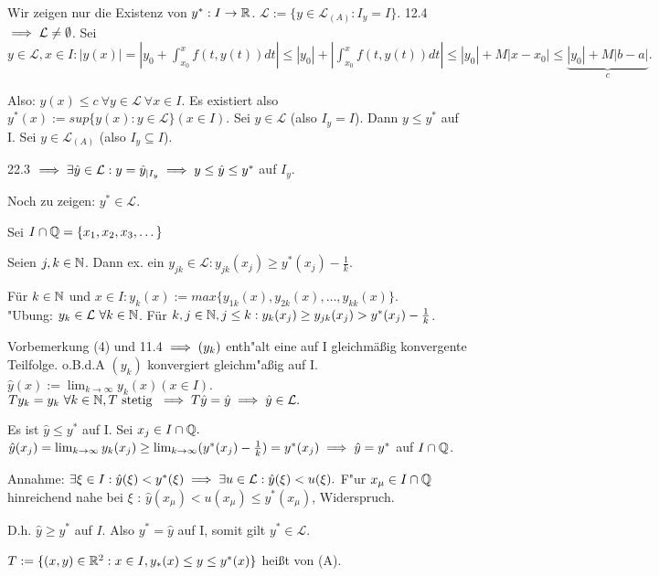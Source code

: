 \documentclass{article}
\begin{document}
\begin{beweis}
Wir zeigen nur die Existenz von $y^* : I \to \mathbb{R}$.
  $\mathcal{L} := \{ y \in \mathcal{L}_{(A)} : I_y = I\}$. 12.4 $\implies \mathcal{L} \neq \emptyset$.
Sei $y \in \mathcal{L}, x \in I : |y(x)| = |y_0 + \int_{x_0}^{x} f(t,y(t)) dt| \leq |y_0| + | \int_{x_0}^{x} f(t,y(t)) dt|
\leq |y_0| + M |x-x_0| \leq \underbrace{|y_0| + M | b-a |}_{c}.$

Also: $y(x) \leq c \ \forall y \in \mathcal{L} \ \forall x \in I.$ 
Es existiert also $y^*(x) := sup \{ y(x) : y \in \mathcal{L} \} (x \in I).$
Sei $y \in  \mathcal{L}$ (also $I_y = I$). Dann $y \leq y^*$ auf I. Sei $y \in \mathcal{L}_{(A)}$ (also $I_y \subseteq I$). 

22.3 $\implies \exists \hat{y} \in \mathcal{L}: y = \hat{y}_{|I_y} \implies y \leq \hat{y} \leq y^*$ auf $I_y$.

Noch zu zeigen: $y^* \in \mathcal{L}.$

Sei $I \cap \mathbb{Q} = \{ x_1,x_2,x_3, \dots \} $

Seien $j,k \in \mathbb{N}$. Dann ex. ein $y_{jk} \in \mathcal{L}: y_{jk}(x_j) \geq y^*(x_j) - \frac{1}{k}.$

Für $k \in \mathbb{N}$ und $x\in I: y_k(x) := max\{y_{1k}(x),y_{2k}(x),\dots, y_{kk}(x)\}. $\\ "Ubung: $y_k \in \mathcal{L} \ \forall k \in \mathbb{N}$.
Für $k,j  \in \mathbb{N}, j \leq k: y_k(x_j) \geq  y_{jk}(x_j) > y^*(x_j) - \frac{1}{k}$.

Vorbemerkung (4) und 11.4 $\implies (y_k)$ enth"alt eine auf I gleichmäßig konvergente Teilfolge. o.B.d.A $(y_k)$ konvergiert gleichm"aßig auf I.
$\hat{y}(x) := \lim_{k \to \infty} y_k(x) ( x \in I )$.
 $T y_k = y_k \ \forall k \in \mathbb{N}, T\text{ stetig }\implies T \hat{y} = \hat{y} \implies \hat{y} \in \mathcal{L}.$
 
Es ist $\hat{y} \leq  y^*$ auf I. Sei $x_j \in I \cap \mathbb{Q}.$
$\hat{y}(x_j) = \lim_{k \to \infty} y_k(x_j) \geq  \lim_{k \to \infty} (y^*(x_j)-\frac{1}{k}) = y^*(x_j) \implies 
\hat{y} = y^*$ auf $I\cap \mathbb{Q}$.

Annahme: $\exists \xi \in I: \hat{y}(\xi) < y^*(\xi) \implies \exists u \in \mathcal{L} : \hat{y}(\xi) < u(\xi).$
F"ur $x_{\mu} \in I \cap \mathbb{Q}$ hinreichend nahe bei $\xi$ : $\hat{y}(x_{\mu}) < u(x_{\mu}) \leq y^*(x_{\mu})$, Widerspruch.

D.h. $\hat{y} \geq y^*$ auf $I$. Also $y^* = \hat{y}$ auf I,  somit gilt $ y^* \in \mathcal{L}.$
\end{beweis}

\begin{definition}
$T := \{ (x,y) \in \mathbb{R}^2 : x \in I, y_*(x) \leq y \leq y^*(x) \}$ heißt  von (A).
\end{definition}
\end{document}
